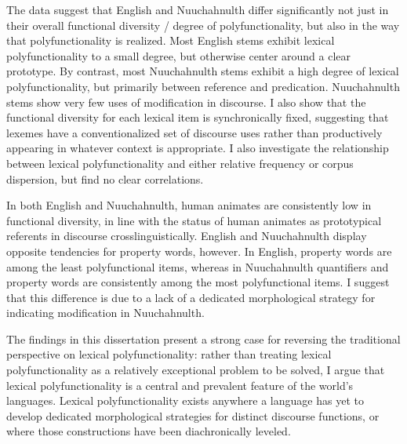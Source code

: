 The data suggest that English and Nuuchahnulth differ significantly not just in their overall functional diversity / degree of polyfunctionality, but also in the way that polyfunctionality is realized. Most English stems exhibit lexical polyfunctionality to a small degree, but otherwise center around a clear prototype. By contrast, most Nuuchahnulth stems exhibit a high degree of lexical polyfunctionality, but primarily between reference and predication. Nuuchahnulth stems show very few uses of modification in discourse. I also show that the functional diversity for each lexical item is synchronically fixed, suggesting that lexemes have a conventionalized set of discourse uses rather than productively appearing in whatever context is appropriate. I also investigate the relationship between lexical polyfunctionality and either relative frequency or corpus dispersion, but find no clear correlations.

In both English and Nuuchahnulth, human animates are consistently low in functional diversity, in line with the status of human animates as prototypical referents in discourse crosslinguistically. English and Nuuchahnulth display opposite tendencies for property words, however. In English, property words are among the least polyfunctional items, whereas in Nuuchahnulth quantifiers and property words are consistently among the most polyfunctional items. I suggest that this difference is due to a lack of a dedicated morphological strategy for indicating modification in Nuuchahnulth.

The findings in this dissertation present a strong case for reversing the traditional perspective on lexical polyfunctionality: rather than treating lexical polyfunctionality as a relatively exceptional problem to be solved, I argue that lexical polyfunctionality is a central and prevalent feature of the world's languages. Lexical polyfunctionality exists anywhere a language has yet to develop dedicated morphological strategies for distinct discourse functions, or where those constructions have been diachronically leveled.
